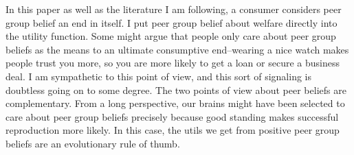 \documentclass[12pt]{article}
\begin{document}
In this paper as well as the literature I am following, a consumer considers peer group belief an end in itself.  I put peer group belief about welfare directly into the utility function.  Some might argue that people only care about peer group beliefs as the means to an ultimate consumptive end--wearing a nice watch makes people trust you more, so you are more likely to get a loan or secure a business deal.  I am sympathetic to this point of view, and this sort of signaling is doubtless going on to some degree.  The two points of view about peer beliefs are complementary.  From a long perspective, our brains might have been selected to care about peer group beliefs precisely because good standing makes successful reproduction more likely. In this case, the utils we get from positive peer group beliefs are an evolutionary rule of thumb.\citep{RobsonSamuelson2010}
\end{document}
